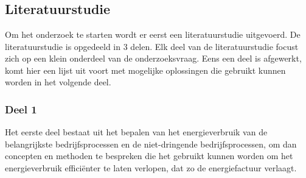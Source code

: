 
\chapter{}%
\label{ch:methodologie}


\section{Literatuurstudie}
\label{sec:methodologie-literatuurstudie}

Om het onderzoek te starten wordt er eerst een literatuurstudie uitgevoerd. De literatuurstudie is opgedeeld in 3 delen. Elk deel van de literatuurstudie focust zich op een klein onderdeel van de onderzoeksvraag. Eens een deel is afgewerkt, komt hier een lijst uit voort met mogelijke oplossingen die gebruikt kunnen worden in het volgende deel.

\subsection{Deel 1}
\label{subsec:methodologie-literatuurstudie-deel1}

Het eerste deel bestaat uit het bepalen van het energieverbruik van de belangrijkste bedrijfsprocessen en de niet-dringende bedrijfsprocessen, om dan concepten en methoden te bespreken die het gebruikt kunnen worden om het energieverbruik efficiënter te laten verlopen, dat zo de energiefactuur verlaagt.

